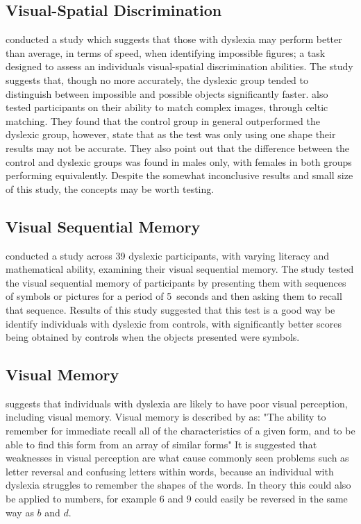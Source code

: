 \documentclass[journal]{IEEEtran}
\begin{document}
\subsection{Visual-Spatial Discrimination}
\label{sec:visualspatial}
\cite{figuresceltic} conducted a study which suggests that those with dyslexia may perform better than average, in terms of speed, when identifying impossible figures; a task designed to assess an individuals visual-spatial discrimination abilities. The study suggests that, though no more accurately, the dyslexic group tended to distinguish between impossible and possible objects significantly faster. \cite{figuresceltic} also tested participants on their ability to match complex images, through celtic matching. They found that the control group in general outperformed the dyslexic group, however, state that as the test was only using one shape their results may not be accurate. They also point out that the difference between the control and dyslexic groups was found in males only, with females in both groups performing equivalently. Despite the somewhat inconclusive results and small size of this study, the concepts may be worth testing. 

\subsection{Visual Sequential Memory}
\label{sec:visualsequentialmemory}
\cite{sequential} conducted a study across 39 dyslexic participants, with varying literacy and mathematical ability, examining their visual sequential memory. The study tested the visual sequential memory of participants by presenting them with sequences of symbols or pictures for a period of 5~seconds and then asking them to recall that sequence.  Results of this study suggested that this test is a good way be identify individuals with dyslexic from controls, with significantly better scores being obtained by controls when the objects presented were symbols.
 
\subsection{Visual Memory}
\label{sec:visualmemory}
\cite{snowlinghandbook} suggests that individuals with dyslexia are likely to have poor visual perception, including visual memory. Visual memory is described by \cite{snowlinghandbook} as:
	"The ability to remember for immediate recall all of the characteristics of a given form, and to be able to find this form from an array of similar forms"
It is suggested that weaknesses in visual perception are what cause commonly seen problems such as letter reversal and confusing letters within words, because an individual with dyslexia struggles to remember the shapes of the words. In theory this could also be applied to numbers, for example $6$ and $9$ could easily be reversed in the  same way as $b$ and $d$.
\end{document}
